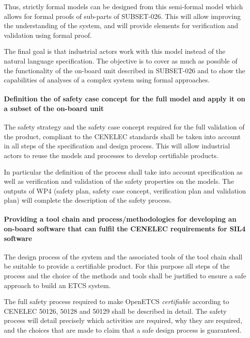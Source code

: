 Thus, strictly formal models can be designed from this semi-formal model which allows for formal proofs of sub-parts of SUBSET-026. This will allow improving the understanding of the system, and will provide elements for verification and validation using formal proof.

The final goal is that industrial actors work with this model instead of the
natural language specification.
The objective is to cover as much as possible of the  functionality of the on-board unit described in SUBSET-026 and to show the capabilities of analyses of a complex system using formal approaches.

\paragraph{Definition the of safety case concept for the full model and apply it on a subset of the on-board unit}
The safety strategy and the safety case concept required for the full validation of the product, compliant to the CENELEC standards shall be taken into account in all steps of the specification and design process. This will allow industrial actors to reuse the models and processes to develop certifiable products.

In particular the definition of the process shall take into account specification as well as verification and validation of the safety properties on the models. The outputs of WP4 (safety plan, safety case concept, verification plan and validation plan) will complete the description of the safety process.


\paragraph{Providing a tool chain and process/methodologies for developing
an on-board software that can fulfil the CENELEC requirements for SIL4 software}

The design process of the system and the associated tools of the tool chain shall be suitable to provide a certifiable product. For this purpose all steps of the process and the choice of the methods and tools shall be justified to ensure a safe approach to build an ETCS system.

The full safety process required to make OpenETCS \emph{certifiable} according to CENELEC 50126, 50128 and 50129 shall be described in detail. The safety process will detail precisely which activities are required, why they are required, and the choices that are made to claim that a safe design process is guaranteed.

